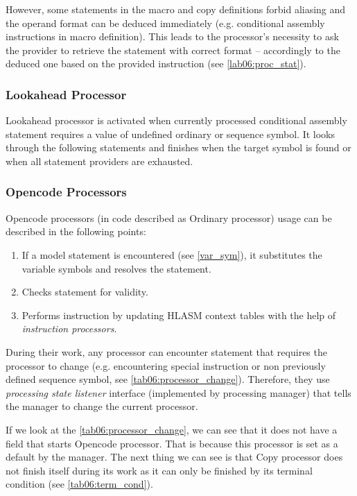 However, some statements in the macro and copy definitions forbid aliasing and the operand format can be deduced immediately (e.g. conditional assembly instructions in macro definition). This leads to the processor's necessity to ask the provider to retrieve the statement with correct format -- accordingly to the deduced one based on the provided instruction  (see \cref{lab06:proc_stat}).

\subsubsection{Lookahead Processor}
\label{lab06:look}

Lookahead processor is activated when currently processed conditional assembly statement requires a value of undefined ordinary or sequence symbol. It looks through the following statements and finishes when the target symbol is found or when all statement providers are exhausted.

\subsubsection{Opencode Processors}
\label{ord_proc}
Opencode processors (in code described as Ordinary processor) usage can be described in the following points:
\begin{enumerate}
	\item If a model statement is encountered (see \cref{var_sym}), it substitutes the variable symbols and resolves the statement.
	\item Checks statement for validity.
	\item Performs instruction by updating HLASM context tables with the help of \emph{instruction processors}.
\end{enumerate}

\vspace{0.5cm}

During their work, any processor can encounter statement that requires the processor to change (e.g. encountering special instruction or non previously defined sequence symbol, see \cref{tab06:processor_change}). Therefore, they use \emph{processing state listener} interface (implemented by processing manager) that tells the manager to change the current processor.

If we look at the \cref{tab06:processor_change}, we can see that it does not have a field that starts Opencode processor. That is because this processor is set as a default by the manager. The next thing we can see is that Copy processor does not finish itself during its work as it can only be finished by its terminal condition (see \cref{tab06:term_cond}). 

